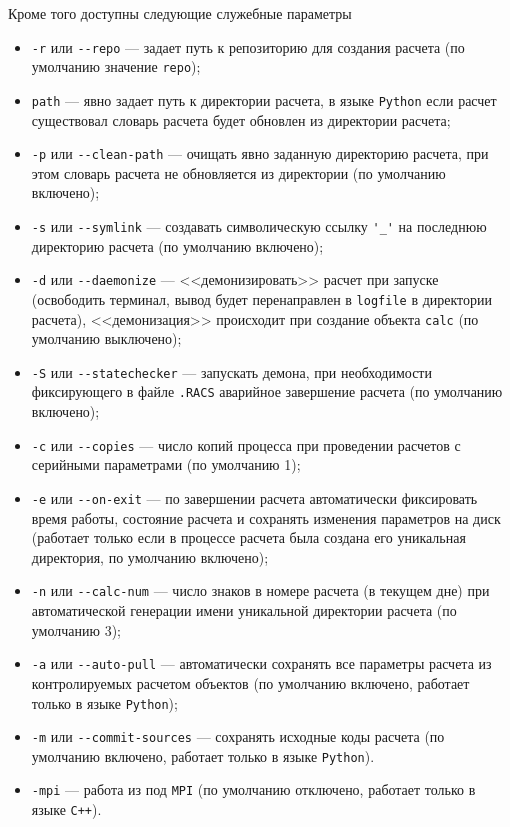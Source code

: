 Кроме того доступны следующие служебные параметры
\begin{itemize}
\item\verb'-r' или \verb'--repo' --- задает путь к репозиторию для создания расчета (по умолчанию значение \verb'repo');
\item\verb'path' --- явно задает путь к директории расчета, в языке \verb'Python' если расчет существовал 
  словарь расчета будет обновлен из директории расчета;
\item\verb'-p' или \verb'--clean-path' --- очищать явно заданную директорию расчета, при этом
                          словарь расчета не обновляется из директории (по умолчанию включено);
\item\verb'-s' или \verb'--symlink' --- создавать символическую ссылку \verb|'_'| на последнюю 
  директорию расчета (по умолчанию включено);
\item\verb'-d' или \verb'--daemonize' --- <<демонизировать>> расчет при запуске (освободить терминал, 
  вывод будет перенаправлен в \verb'logfile' в директории расчета),
  <<демонизация>> происходит при создание объекта \verb'calc' (по умолчанию выключено);
\item\verb'-S' или \verb'--statechecker' --- запускать демона, при необходимости фиксирующего в файле \verb'.RACS' аварийное
                            завершение расчета (по умолчанию включено);
\item\verb'-c' или \verb'--copies' --- число копий процесса при проведении расчетов с серийными 
  параметрами (по умолчанию 1);
\item\verb'-e' или \verb'--on-exit' --- по завершении расчета автоматически фиксировать время работы,
  состояние расчета и сохранять изменения параметров на диск (работает только если в процессе расчета была создана его уникальная директория, по умолчанию включено);
\item\verb'-n' или \verb'--calc-num' --- число знаков в номере расчета (в текущем дне) при 
  автоматической генерации имени уникальной директории расчета (по умолчанию 3);
\item\verb'-a' или \verb'--auto-pull' --- автоматически сохранять все параметры расчета из 
                         контролируемых расчетом объектов (по умолчанию включено, работает только в языке \verb'Python');
\item\verb'-m' или \verb'--commit-sources' --- сохранять исходные коды расчета (по умолчанию включено, работает только в языке \verb'Python').
\item\verb'-mpi' --- работа из под \verb'MPI'  (по умолчанию отключено, работает только в языке \verb'C++').
\end{itemize}

